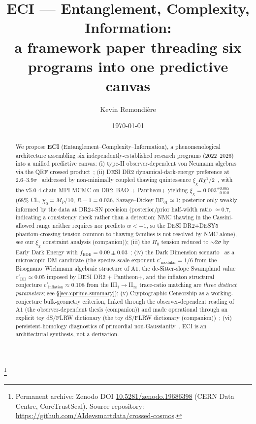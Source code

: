 \documentclass[reprint,amsmath,amssymb,aps,prd,superscriptaddress]{revtex4-2}
\providecommand{\1}{\mathbf{1}}
\begin{document}
\title{ECI --- Entanglement, Complexity, Information:\\
a framework paper threading six programs into one predictive canvas}

\author{Kevin Remondi\`ere}

\date{\today}

\thanks{Permanent archive: Zenodo DOI \href{https://doi.org/10.5281/zenodo.19686398}{10.5281/zenodo.19686398} (CERN Data Centre, CoreTrustSeal). Source repository: \url{https://github.com/AIdevsmartdata/crossed-cosmos}.}

\begin{abstract}
We propose \textbf{ECI} (Entanglement--Complexity--Information), a phenomenological architecture assembling six independently-established research programs (2022--2026) into a unified predictive canvas: (i) type-II observer-dependent von Neumann algebras via the QRF crossed product~\cite{CLPW2023,DEHK2025a,DEHK2025b}; (ii) DESI DR2 dynamical-dark-energy preference at 2.6--3.9$\sigma$~\cite{DESIDR2} addressed by non-minimally coupled thawing quintessence $\xi_\chi R \chi^2/2$~\cite{Ye2025,Wolf2025,PanYe2026}, with the v5.0 4-chain MPI MCMC on DR2~BAO + Pantheon+ yielding $\xi_\chi=0.003^{+0.065}_{-0.070}$ (68\% CL, $\chi_0=M_P/10$, $R-1=0.036$, Savage--Dickey $\mathrm{BF}_{01}\simeq 1$; posterior only weakly informed by the data at DR2+SN precision (posterior/prior half-width ratio $\simeq 0.7$, indicating a consistency check rather than a detection; NMC thawing in the Cassini-allowed range neither requires nor predicts $w<-1$, so the DESI DR2+DESY5 phantom-crossing tension common to thawing families is not resolved by NMC alone), see our $\xi_\chi$ constraint analysis (companion)); (iii) the $H_0$ tension reduced to $\sim 2\sigma$ by Early Dark Energy with $f_{\mathrm{EDE}} = 0.09 \pm 0.03$~\cite{PoulinSmith2026}; (iv) the Dark Dimension scenario~\cite{AAL2025,OoguriVafa2007,Bedroya2025} as a microscopic DM candidate (the species-scale exponent $c'_{\mathrm{modular}} = 1/6$ from the Bisognano--Wichmann algebraic structure of A1, the de-Sitter-slope Swampland value $c'_{\mathrm{DD}} \simeq 0.05$ imposed by DESI DR2 + Pantheon+, and the inflaton structural conjecture $c'_{\mathrm{inflation}} \approx 0.108$ from the III$_1\!\to$II$_\infty$ trace-ratio matching are \emph{three distinct parameters}; see \S\ref{sec:cprime-summary}); (v) Cryptographic Censorship as a working-conjecture bulk-geometry criterion, linked through the observer-dependent reading of A1 (the observer-dependent thesis (companion)) and made operational through an explicit toy dS/FLRW dictionary (the toy dS/FLRW dictionary (companion))~\cite{CryptoCensorship}; (vi) persistent-homology diagnostics of primordial non-Gaussianity~\cite{Yip2024}. ECI is an architectural synthesis, not a derivation.
\end{abstract}
\end{document}
